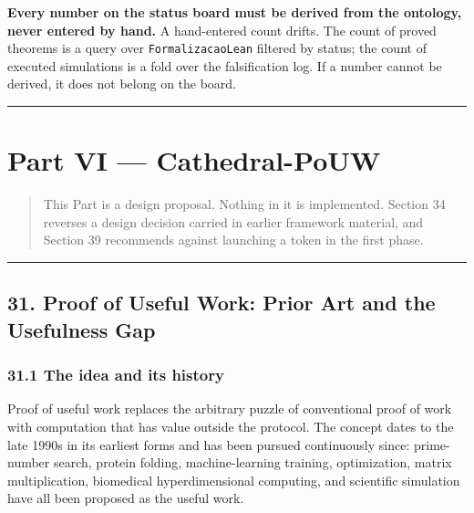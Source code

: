 \documentclass[
  11pt]{report}
\begin{document}
\textbf{Every number on the status board must be derived from the
ontology, never entered by hand.} A hand-entered count drifts. The count
of proved theorems is a query over \texttt{FormalizacaoLean} filtered by
status; the count of executed simulations is a fold over the
falsification log. If a number cannot be derived, it does not belong on
the board.

\begin{center}\rule{0.5\linewidth}{0.5pt}\end{center}

\hypertarget{part-vi-cathedral-pouw}{%
\part{Part VI --- Cathedral-PoUW}\label{part-vi-cathedral-pouw}}

\begin{quote}
This Part is a design proposal. Nothing in it is implemented. Section 34
reverses a design decision carried in earlier framework material, and
Section 39 recommends against launching a token in the first phase.
\end{quote}

\begin{center}\rule{0.5\linewidth}{0.5pt}\end{center}

\hypertarget{proof-of-useful-work-prior-art-and-the-usefulness-gap}{%
\chapter{31. Proof of Useful Work: Prior Art and the Usefulness
Gap}\label{proof-of-useful-work-prior-art-and-the-usefulness-gap}}

\hypertarget{the-idea-and-its-history}{%
\section{31.1 The idea and its history}\label{the-idea-and-its-history}}

Proof of useful work replaces the arbitrary puzzle of conventional proof
of work with computation that has value outside the protocol. The
concept dates to the late 1990s in its earliest forms and has been
pursued continuously since: prime-number search, protein folding,
machine-learning training, optimization, matrix multiplication,
biomedical hyperdimensional computing, and scientific simulation have
all been proposed as the useful work.
\end{document}
